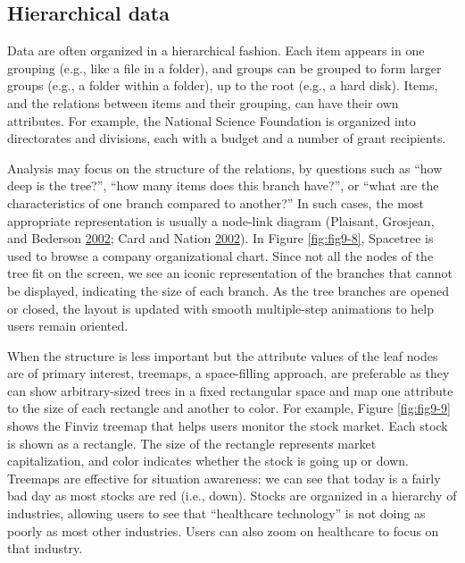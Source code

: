 \documentclass[]{krantz}
\begin{document}
\hypertarget{sec:viz-2.5}{\subsection{Hierarchical
data}\label{sec:viz-2.5}}

Data are often organized in a hierarchical fashion. Each item appears in
one grouping (e.g., like a file in a folder), and groups can be grouped
to form larger groups (e.g., a folder within a folder), up to the root
(e.g., a hard disk). Items, and the relations between items and their
grouping, can have their own attributes. For example, the National
Science Foundation is organized into directorates and divisions, each
with a budget and a number of grant recipients.

Analysis may focus on the structure of the relations, by questions such
as ``how deep is the tree?'', ``how many items does this branch have?'',
or ``what are the characteristics of one branch compared to another?''
In such cases, the most appropriate representation is usually a
node-link diagram (Plaisant, Grosjean, and Bederson
\protect\hyperlink{ref-plaisant2002spacetree}{2002}; Card and Nation
\protect\hyperlink{ref-card2002degree}{2002}). In Figure
\ref{fig:fig9-8}, Spacetree is used to browse a company organizational
chart. Since not all the nodes of the tree fit on the screen, we see an
iconic representation of the branches that cannot be displayed,
indicating the size of each branch. As the tree branches are opened or
closed, the layout is updated with smooth multiple-step animations to
help users remain oriented.

When the structure is less important but the attribute values of the
leaf nodes are of primary interest, treemaps, a space-filling approach,
are preferable as they can show arbitrary-sized trees in a fixed
rectangular space and map one attribute to the size of each rectangle
and another to color. For example, Figure \ref{fig:fig9-9} shows the
Finviz treemap that helps users monitor the stock market. Each stock is
shown as a rectangle. The size of the rectangle represents market
capitalization, and color indicates whether the stock is going up or
down. Treemaps are effective for situation awareness: we can see that
today is a fairly bad day as most stocks are red (i.e., down). Stocks
are organized in a hierarchy of industries, allowing users to see that
``healthcare technology'' is not doing as poorly as most other
industries. Users can also zoom on healthcare to focus on that industry.
\end{document}
